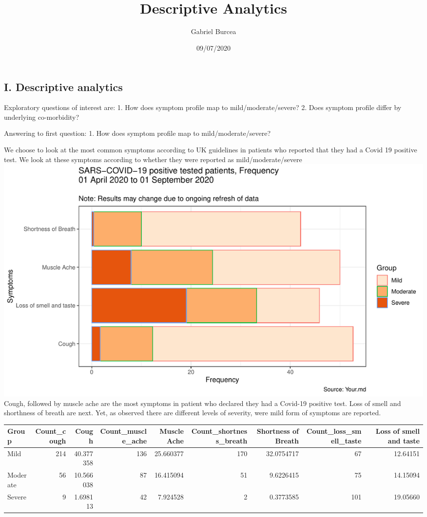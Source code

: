 \documentclass[
]{article}
\title{Descriptive Analytics}
\author{Gabriel Burcea}
\date{09/07/2020}
\begin{document}
\maketitle

{
\setcounter{tocdepth}{2}
\tableofcontents
}
\hypertarget{i.-descriptive-analytics}{%
\subsection{I. Descriptive analytics}\label{i.-descriptive-analytics}}

Exploratory questions of interest are: 1. How does symptom profile map
to mild/moderate/severe? 2. Does symptom profile differ by underlying
co-morbidity?

Answering to first question: 1. How does symptom profile map to
mild/moderate/severe?

We choose to look at the most common symptoms according to UK guidelines
in patients who reported that they had a Covid 19 positive test. We look
at these symptoms according to whether they were reported as
mild/moderate/severe
\includegraphics{Final_descript_analysis_files/figure-latex/symptoms_covid_in_resp-1.pdf}
Cough, followed by muscle ache are the most symptoms in patient who
declared they had a Covid-19 positive test. Loss of smell and shorthness
of breath are next. Yet, as observed there are different levels of
severity, were mild form of symptoms are reported.

\begin{longtable}[]{@{}lrrrrrrrr@{}}
\toprule
Group & Count\_cough & Cough & Count\_muscle\_ache & Muscle Ache &
Count\_shortness\_breath & Shortness of Breath &
Count\_loss\_smell\_taste & Loss of smell and taste\tabularnewline
\midrule
\endhead
Mild & 214 & 40.377358 & 136 & 25.660377 & 170 & 32.0754717 & 67 &
12.64151\tabularnewline
Moderate & 56 & 10.566038 & 87 & 16.415094 & 51 & 9.6226415 & 75 &
14.15094\tabularnewline
Severe & 9 & 1.698113 & 42 & 7.924528 & 2 & 0.3773585 & 101 &
19.05660\tabularnewline
\bottomrule
\end{longtable}
\end{document}
